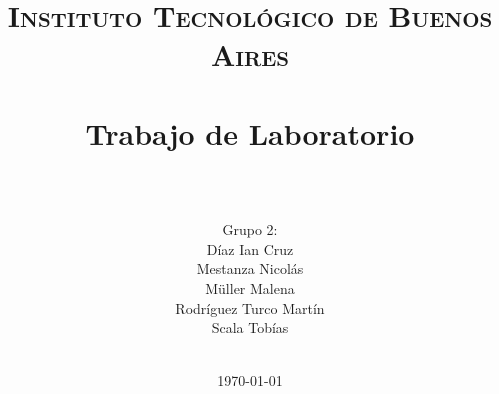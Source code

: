 









\title{
	\normalfont \normalsize \textsc{Instituto Tecnológico de Buenos Aires} \\ [25pt]
	\horrule{2pt} \\[0.4cm]
	\huge Trabajo de Laboratorio \\
	\horrule{2pt} \\[0cm]
\author{Grupo 2:\\Díaz Ian Cruz\\Mestanza Nicol\'as\\ Müller Malena\\Rodr\'iguez Turco Mart\'in\\ Scala Tob\'ias\\ \\ }
}
\date{\today} %

\maketitle
\newpage




%
%
%
%
%


